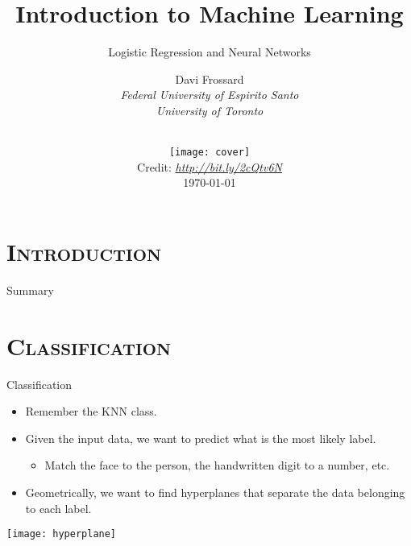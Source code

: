 


\section{\scshape Introduction}
\begin{frame}
\title{Introduction to Machine Learning}
\subtitle{Logistic Regression and Neural Networks}
\author{
	Davi Frossard\\
	{\it Federal University of Espirito Santo \\ University of Toronto}\\
}
\date{
	\vspace{-2em}\\
	\texttt{[image: cover]}\\[-1ex]
	{\tiny Credit: {\itshape \url{http://bit.ly/2cQtv6N}}}
	\\
	\today
}
\titlepage
\end{frame}

\begin{frame}{Summary}
\tableofcontents
\end{frame}

\section{\scshape Classification}
\begin{frame}{Classification}
	\begin{itemize}
		\item Remember the KNN class.
		\item Given the input data, we want to predict what is the most likely label.
		\begin{itemize}
			\item Match the face to the person, the handwritten digit to a number, etc.
		\end{itemize}
		\item Geometrically, we want to find hyperplanes that separate the data belonging to each label.
	\end{itemize}
	\begin{center}
		\texttt{[image: hyperplane]}
	\end{center}	
\end{frame}

